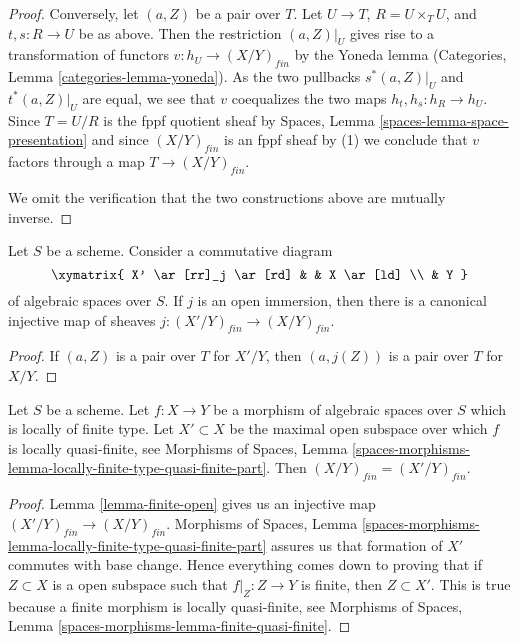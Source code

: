 \begin{proof}
\medskip\noindent
Conversely, let $(a, Z)$ be a pair over $T$.
Let $U \to T$, $R = U \times_T U$, and $t, s : R \to U$ be as
above. Then the restriction $(a, Z)|_U$ gives rise to a
transformation of functors $v : h_U \to (X/Y)_{fin}$ by the
Yoneda lemma
(Categories, Lemma \ref{categories-lemma-yoneda}).
As the two pullbacks $s^*(a, Z)|_U$ and $t^*(a, Z)|_U$
are equal, we see that $v$ coequalizes the two maps
$h_t, h_s : h_R \to h_U$. Since $T = U/R$ is the fppf quotient sheaf by
Spaces, Lemma \ref{spaces-lemma-space-presentation}
and since $(X/Y)_{fin}$ is an fppf sheaf by (1) we conclude
that $v$ factors through a map $T \to (X/Y)_{fin}$.

\medskip\noindent
We omit the verification that the two constructions above are mutually
inverse.
\end{proof}

\begin{lemma}
\label{lemma-finite-open}
Let $S$ be a scheme. Consider a commutative diagram
$$
\xymatrix{
X' \ar[rr]_j \ar[rd] & & X \ar[ld] \\
& Y
}
$$
of algebraic spaces over $S$. If $j$ is an open immersion, then
there is a canonical injective map of sheaves
$j : (X'/Y)_{fin} \to (X/Y)_{fin}$.
\end{lemma}

\begin{proof}
If $(a, Z)$ is a pair over $T$ for $X'/Y$, then
$(a, j(Z))$ is a pair over $T$ for $X/Y$.
\end{proof}

\begin{lemma}
\label{lemma-finite-lives-on-locally-quasi-finite-part}
Let $S$ be a scheme.
Let $f : X \to Y$ be a morphism of algebraic spaces over $S$ which is
locally of finite type.
Let $X' \subset X$ be the maximal open subspace over which $f$ is
locally quasi-finite, see
Morphisms of Spaces,
Lemma \ref{spaces-morphisms-lemma-locally-finite-type-quasi-finite-part}.
Then $(X/Y)_{fin} = (X'/Y)_{fin}$.
\end{lemma}

\begin{proof}
Lemma \ref{lemma-finite-open}
gives us an injective map $(X'/Y)_{fin} \to (X/Y)_{fin}$.
Morphisms of Spaces,
Lemma \ref{spaces-morphisms-lemma-locally-finite-type-quasi-finite-part}
assures us that formation of $X'$ commutes with base change.
Hence everything comes down to proving that if
$Z \subset X$ is a open subspace such that $f|_Z : Z \to Y$ is finite,
then $Z \subset X'$. This is true because a finite morphism
is locally quasi-finite, see
Morphisms of Spaces, Lemma \ref{spaces-morphisms-lemma-finite-quasi-finite}.
\end{proof}

